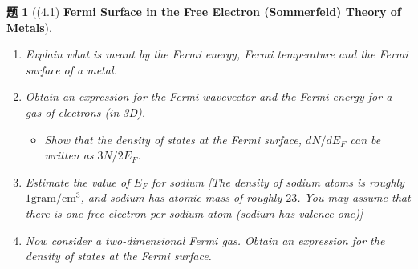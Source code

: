 \documentclass[UTF8,10pt,a4paper]{article}
\theoremstyle{Problem}
\newtheorem{prob}{题}
\theoremstyle{Solution}
\begin{document}
\thispagestyle{FirstPageStyle}
\begin{prob}[(4.1) \textbf{Fermi Surface in the Free Electron (Sommerfeld) Theory of Metals}]
    \begin{enumerate}
        \item[(a)$\ddagger$] Explain what is meant by the Fermi energy, Fermi temperature and the Fermi surface of a metal.
        \item[(b)$\ddagger$] Obtain an expression for the Fermi wavevector and the Fermi energy for a gas of electrons (in 3D).
        \begin{itemize}
            \item[$\triangleright$] Show that the density of states at the Fermi surface, $dN/dE_F$ can be written as $3N/2E_F$.
        \end{itemize}
        \item[(c)] Estimate the value of $E_F$ for sodium [The density of sodium atoms is roughly $1\text{gram}/\text{cm}^3$, and sodium has atomic mass of roughly $23$. You may assume that there is one free electron per sodium atom (sodium has \textit{valence} one)]
        \item[(d)] Now consider a two-dimensional Fermi gas. Obtain an expression for the density of states at the Fermi surface. 
    \end{enumerate}
\end{prob}
\end{document}
